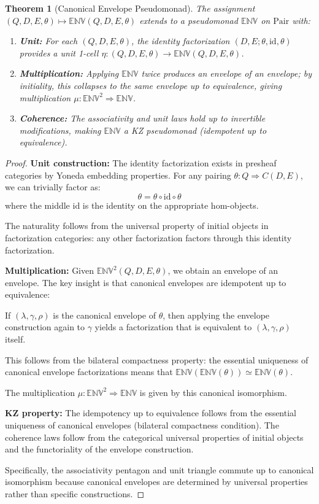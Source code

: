 \documentclass[11pt]{article}
\theoremstyle{plain}
\newtheorem{theorem}{Theorem}[section]
\theoremstyle{definition}
\theoremstyle{remark}
\newcommand{\id}{\mathrm{id}}
\newcommand{\Pair}{\mathrm{Pair}}
\begin{document}
\begin{theorem}[Canonical Envelope Pseudomonad]
The assignment $(Q, D, E, \theta) \mapsto \mathbb{ENV}(Q, D, E, \theta)$ extends to a pseudomonad $\mathbb{ENV}$ on $\Pair$ with:

\begin{enumerate}
\item \textbf{Unit:} For each $(Q, D, E, \theta)$, the identity factorization $(D, E; \theta, \id, \theta)$ provides a unit 1-cell $\eta : (Q, D, E, \theta) \to \mathbb{ENV}(Q, D, E, \theta)$.

\item \textbf{Multiplication:} Applying $\mathbb{ENV}$ twice produces an envelope of an envelope; by initiality, this collapses to the same envelope up to equivalence, giving multiplication $\mu : \mathbb{ENV}^2 \Rightarrow \mathbb{ENV}$.

\item \textbf{Coherence:} The associativity and unit laws hold up to invertible modifications, making $\mathbb{ENV}$ a KZ pseudomonad (idempotent up to equivalence).
\end{enumerate}
\end{theorem}

\begin{proof}
\textbf{Unit construction:} The identity factorization exists in presheaf categories by Yoneda embedding properties. For any pairing $\theta : Q \Rightarrow C(D, E)$, we can trivially factor as:
$$
\theta = \theta \circ \id \circ \theta
$$
where the middle $\id$ is the identity on the appropriate hom-objects.

The naturality follows from the universal property of initial objects in factorization categories: any other factorization factors through this identity factorization.

\textbf{Multiplication:} Given $\mathbb{ENV}^2(Q, D, E, \theta)$, we obtain an envelope of an envelope. The key insight is that canonical envelopes are idempotent up to equivalence:

If $(\lambda, \gamma, \rho)$ is the canonical envelope of $\theta$, then applying the envelope construction again to $\gamma$ yields a factorization that is equivalent to $(\lambda, \gamma, \rho)$ itself.

This follows from the bilateral compactness property: the essential uniqueness of canonical envelope factorizations means that $\mathbb{ENV}(\mathbb{ENV}(\theta)) \simeq \mathbb{ENV}(\theta)$.

The multiplication $\mu : \mathbb{ENV}^2 \Rightarrow \mathbb{ENV}$ is given by this canonical isomorphism.

\textbf{KZ property:} The idempotency up to equivalence follows from the essential uniqueness of canonical envelopes (bilateral compactness condition). The coherence laws follow from the categorical universal properties of initial objects and the functoriality of the envelope construction.

Specifically, the associativity pentagon and unit triangle commute up to canonical isomorphism because canonical envelopes are determined by universal properties rather than specific constructions.
\end{proof}
\end{document}
